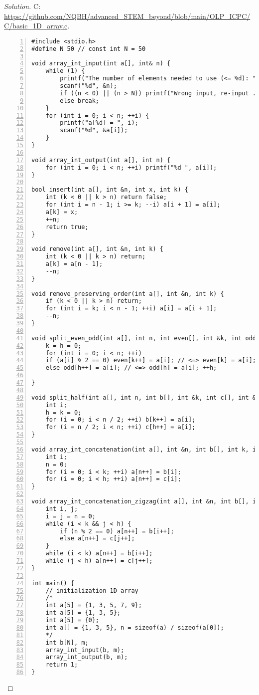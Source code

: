 \documentclass{article}
\begin{document}
\begin{proof}[Solution]
    C: \url{https://github.com/NQBH/advanced_STEM_beyond/blob/main/OLP_ICPC/C/basic_1D_array.c}.
    \begin{Verbatim}[numbers=left,xleftmargin=5mm]
#include <stdio.h>
#define N 50 // const int N = 50

void array_int_input(int a[], int& n) {
    while (1) {
        printf("The number of elements needed to use (<= %d): ", N);
        scanf("%d", &n);
        if ((n < 0) || (n > N)) printf("Wrong input, re-input ...\n");
        else break;
    }
    for (int i = 0; i < n; ++i) {
        printf("a[%d] = ", i);
        scanf("%d", &a[i]);
    }
}

void array_int_output(int a[], int n) {
    for (int i = 0; i < n; ++i) printf("%d ", a[i]);
}

bool insert(int a[], int &n, int x, int k) {
    int (k < 0 || k > n) return false;
    for (int i = n - 1; i >= k; --i) a[i + 1] = a[i];
    a[k] = x;
    ++n;
    return true;
}

void remove(int a[], int &n, int k) {
    int (k < 0 || k > n) return;
    a[k] = a[n - 1];
    --n;
}

void remove_preserving_order(int a[], int &n, int k) {
    if (k < 0 || k > n) return;
    for (int i = k; i < n - 1; ++i) a[i] = a[i + 1];
    --n;
}

void split_even_odd(int a[], int n, int even[], int &k, int odd[], int &h) {
    k = h = 0;
    for (int i = 0; i < n; ++i)
    if (a[i] % 2 == 0) even[k++] = a[i]; // <=> even[k] = a[i]; ++k;
    else odd[h++] = a[i]; // <=> odd[h] = a[i]; ++h;

}

void split_half(int a[], int n, int b[], int &k, int c[], int &h) {
    int i;
    h = k = 0;
    for (i = 0; i < n / 2; ++i) b[k++] = a[i];
    for (i = n / 2; i < n; ++i) c[h++] = a[i];
}

void array_int_concatenation(int a[], int &n, int b[], int k, int c[], int h) {
    int i;
    n = 0;
    for (i = 0; i < k; ++i) a[n++] = b[i];
    for (i = 0; i < h; ++i) a[n++] = c[i];
}

void array_int_concatenation_zigzag(int a[], int &n, int b[], int k, int c[], int h) {
    int i, j;
    i = j = n = 0;
    while (i < k && j < h) {
        if (n % 2 == 0) a[n++] = b[i++];
        else a[n++] = c[j++];
    }
    while (i < k) a[n++] = b[i++];
    while (j < h) a[n++] = c[j++];
}

int main() {
    // initialization 1D array
    /*
    int a[5] = {1, 3, 5, 7, 9};
    int a[5] = {1, 3, 5};
    int a[5] = {0};
    int a[] = {1, 3, 5}, n = sizeof(a) / sizeof(a[0]);
    */
    int b[N], m;
    array_int_input(b, m);
    array_int_output(b, m);
    return 1;
}
    \end{Verbatim}
\end{proof}
\end{document}
